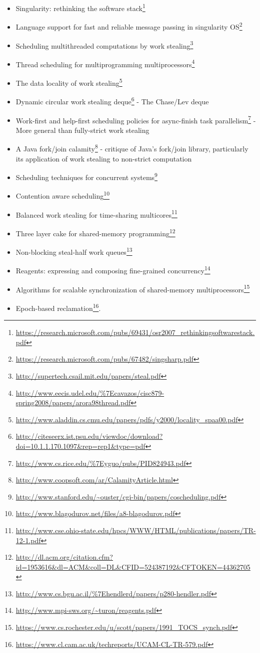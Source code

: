 \documentclass[a4paper,]{book}
\renewcommand{\href}[2]{#2\footnote{\url{#1}}}
\begin{document}
\begin{itemize}
\itemsep1pt\parskip0pt
\item
  \href{https://research.microsoft.com/pubs/69431/osr2007_rethinkingsoftwarestack.pdf}{Singularity:
  rethinking the software stack}
\item
  \href{https://research.microsoft.com/pubs/67482/singsharp.pdf}{Language
  support for fast and reliable message passing in singularity OS}
\item
  \href{http://supertech.csail.mit.edu/papers/steal.pdf}{Scheduling
  multithreaded computations by work stealing}
\item
  \href{http://www.eecis.udel.edu/\%7Ecavazos/cisc879-spring2008/papers/arora98thread.pdf}{Thread
  scheduling for multiprogramming multiprocessors}
\item
  \href{http://www.aladdin.cs.cmu.edu/papers/pdfs/y2000/locality_spaa00.pdf}{The
  data locality of work stealing}
\item
  \href{http://citeseerx.ist.psu.edu/viewdoc/download?doi=10.1.1.170.1097\&rep=rep1\&type=pdf}{Dynamic
  circular work stealing deque} - The Chase/Lev deque
\item
  \href{http://www.cs.rice.edu/\%7Eyguo/pubs/PID824943.pdf}{Work-first
  and help-first scheduling policies for async-finish task parallelism}
  - More general than fully-strict work stealing
\item
  \href{http://www.coopsoft.com/ar/CalamityArticle.html}{A Java
  fork/join calamity} - critique of Java's fork/join library,
  particularly its application of work stealing to non-strict
  computation
\item
  \href{http://www.stanford.edu/~ouster/cgi-bin/papers/coscheduling.pdf}{Scheduling
  techniques for concurrent systems}
\item
  \href{http://www.blagodurov.net/files/a8-blagodurov.pdf}{Contention
  aware scheduling}
\item
  \href{http://www.cse.ohio-state.edu/hpcs/WWW/HTML/publications/papers/TR-12-1.pdf}{Balanced
  work stealing for time-sharing multicores}
\item
  \href{http://dl.acm.org/citation.cfm?id=1953616\&dl=ACM\&coll=DL\&CFID=524387192\&CFTOKEN=44362705}{Three
  layer cake for shared-memory programming}
\item
  \href{http://www.cs.bgu.ac.il/\%7Ehendlerd/papers/p280-hendler.pdf}{Non-blocking
  steal-half work queues}
\item
  \href{http://www.mpi-sws.org/~turon/reagents.pdf}{Reagents: expressing
  and composing fine-grained concurrency}
\item
  \href{https://www.cs.rochester.edu/u/scott/papers/1991_TOCS_synch.pdf}{Algorithms
  for scalable synchronization of shared-memory multiprocessors}
\item
  \href{https://www.cl.cam.ac.uk/techreports/UCAM-CL-TR-579.pdf}{Epoch-based
  reclamation}.
\end{itemize}
\end{document}
